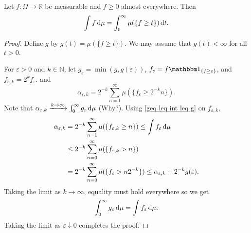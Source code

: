 \begin{theorem}
\label{int func eq int geq}
    Let $f:\Omega\to\mathbb{R}$ be measurable and $f\geq 0$ almost everywhere. Then
    $$\int f\operatorname{d}\!{\mu} = \int_0^\infty \mu(\{f\geq t\})\operatorname{d}\!{t}.$$
\end{theorem}
\begin{proof}
    Define $g$ by $g(t)=\mu(\{f\geq t\})$. We may assume that $g(t)<\infty$ for all $t>0$.
    
    For $\varepsilon>0$ and $k\in\mathbb{N}$, let $g_\varepsilon = \min(g, g(\varepsilon))$, $f_\varepsilon=f\indic_{\{f\geq\varepsilon\}}$, and $f_{\varepsilon,k}=2^kf_\varepsilon$. and
    $$\alpha_{\varepsilon,k}=2^{-k}\sum_{n=1}^\infty \mu(\{f_{\varepsilon}\geq 2^{-k} n\}).$$
    Note that $\alpha_{\varepsilon,k} \xrightarrow{k\to\infty} \int_0^\infty g_\varepsilon\operatorname{d}\!{\mu}$ (Why?). Using \cref{geq leq int leq g} on $f_{\varepsilon,k}$,
    \begin{align*}
        \alpha_{\varepsilon,k} &= 2^{-k}\sum_{n=1}^\infty \mu(\{f_{\varepsilon,k}\geq n\}) \leq \int f_\varepsilon\operatorname{d}\!{\mu} \\
        &\leq 2^{-k}\sum_{n=0}^\infty \mu(\{f_{\varepsilon,k}> n\}) \\
        &= 2^{-k}\sum_{n=0}^\infty \mu(\{f_{\varepsilon}> n2^{-k}\}) \leq \alpha_{\varepsilon,k} + 2^{-k}g(\varepsilon).
    \end{align*}
    Taking the limit as $k\to\infty$, equality must hold everywhere so we get
    $$\int_0^\infty g_\varepsilon \operatorname{d}\!{\mu} = \int f_\varepsilon\operatorname{d}\!{\mu}.$$
    Taking the limit as $\varepsilon\downarrow 0$ completes the proof.
\end{proof}

\clearpage